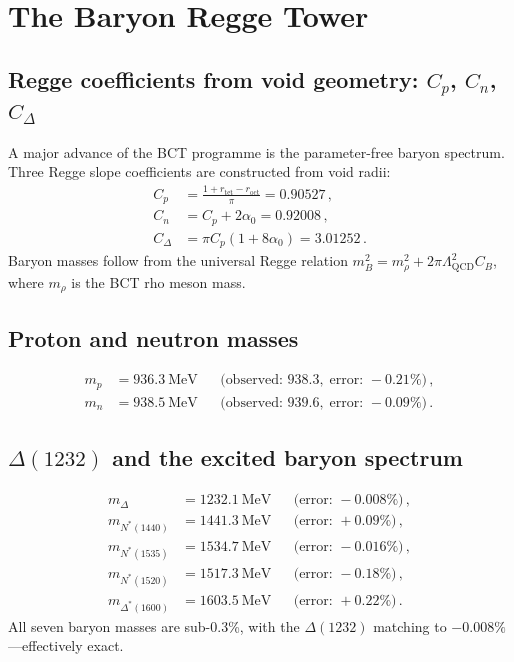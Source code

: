 \documentclass[review,number,sort&compress]{elsarticle}
\newcommand{\roct}{r_{\mathrm{oct}}}
\newcommand{\rtet}{r_{\mathrm{tet}}}
\newcommand{\azero}{\alpha_0}
\newcommand{\LQCD}{\Lambda_{\mathrm{QCD}}}
\begin{document}
\section{The Baryon Regge Tower}
\label{sec:baryons}

\subsection{Regge coefficients from void geometry: $C_p$, $C_n$, $C_\Delta$}

A major advance of the BCT programme is the parameter-free baryon
spectrum. Three Regge slope coefficients are constructed from void radii:
\begin{align}
  C_p &= \frac{1 + \rtet - \roct}{\pi} = 0.90527\,,
  \label{eq:Cp} \\
  C_n &= C_p + 2\azero = 0.92008\,,
  \label{eq:Cn} \\
  C_\Delta &= \pi C_p(1 + 8\azero) = 3.01252\,.
  \label{eq:CDelta}
\end{align}
Baryon masses follow from the universal Regge relation
$m_B^2 = m_\rho^2 + 2\pi\LQCD^2 C_B$, where $m_\rho$ is the
BCT rho meson mass.

\subsection{Proton and neutron masses}

\begin{align}
  m_p &= 936.3~\text{MeV} &&
  \bigl(\text{observed: } 938.3,\;\text{error: } -0.21\%\bigr)\,,
  \label{eq:mp} \\
  m_n &= 938.5~\text{MeV} &&
  \bigl(\text{observed: } 939.6,\;\text{error: } -0.09\%\bigr)\,.
  \label{eq:mn}
\end{align}

\subsection{$\Delta(1232)$ and the excited baryon spectrum}

\begin{align}
  m_\Delta &= 1232.1~\text{MeV} &&
  \bigl(\text{error: } -0.008\%\bigr)\,,
  \label{eq:mDelta} \\
  m_{N^*(1440)} &= 1441.3~\text{MeV} &&
  \bigl(\text{error: } +0.09\%\bigr)\,,
  \label{eq:mN1440} \\
  m_{N^*(1535)} &= 1534.7~\text{MeV} &&
  \bigl(\text{error: } -0.016\%\bigr)\,,
  \label{eq:mN1535} \\
  m_{N^*(1520)} &= 1517.3~\text{MeV} &&
  \bigl(\text{error: } -0.18\%\bigr)\,,
  \label{eq:mN1520} \\
  m_{\Delta^*(1600)} &= 1603.5~\text{MeV} &&
  \bigl(\text{error: } +0.22\%\bigr)\,.
  \label{eq:mDelta1600}
\end{align}
All seven baryon masses are sub-0.3\%, with the $\Delta(1232)$
matching to $-0.008\%$---effectively exact.
\end{document}
